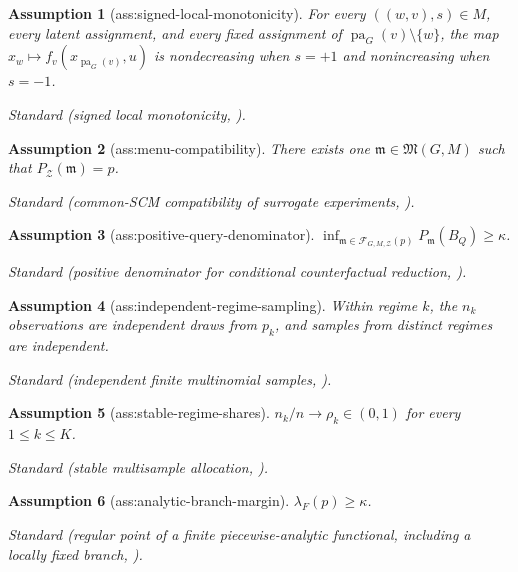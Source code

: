 \documentclass{article}
\newtheorem{assumption}{Assumption}
\begin{document}
\begin{assumption}[ass:signed-local-monotonicity]\label{ass:signed-local-monotonicity}
For every \(((w,v),s)\in M\), every latent assignment, and every fixed assignment of \(\operatorname{pa}_G(v)\setminus\{w\}\), the map \(x_w\mapsto f_v(x_{\operatorname{pa}_G(v)},u)\) is nondecreasing when \(s=+1\) and nonincreasing when \(s=-1\).
\par\smallskip\noindent\emph{Standard} (signed local monotonicity, \cite{MaitiPleckoBareinboim2025}).
\end{assumption}

\begin{assumption}[ass:menu-compatibility]\label{ass:menu-compatibility}
There exists one \(\mathfrak m\in\mathfrak M(G,M)\) such that \(P_{\mathcal Z}(\mathfrak m)=p\).
\par\smallskip\noindent\emph{Standard} (common-SCM compatibility of surrogate experiments, \cite{CorreaLeeBareinboim2021}).
\end{assumption}

\begin{assumption}[ass:positive-query-denominator]\label{ass:positive-query-denominator}
\(\inf_{\mathfrak m\in\mathcal F_{G,M,\mathcal Z}(p)}P_{\mathfrak m}(B_Q)\ge\kappa\).
\par\smallskip\noindent\emph{Standard} (positive denominator for conditional counterfactual reduction, \cite{CorreaLeeBareinboim2021}).
\end{assumption}

\begin{assumption}[ass:independent-regime-sampling]\label{ass:independent-regime-sampling}
Within regime \(k\), the \(n_k\) observations are independent draws from \(p_k\), and samples from distinct regimes are independent.
\par\smallskip\noindent\emph{Standard} (independent finite multinomial samples, \cite{VanDerVaart1998}).
\end{assumption}

\begin{assumption}[ass:stable-regime-shares]\label{ass:stable-regime-shares}
\(n_k/n\to\rho_k\in(0,1)\) for every \(1\le k\le K\).
\par\smallskip\noindent\emph{Standard} (stable multisample allocation, \cite{VanDerVaart1998}).
\end{assumption}

\begin{assumption}[ass:analytic-branch-margin]\label{ass:analytic-branch-margin}
\(\lambda_F(p)\ge\kappa\).
\par\smallskip\noindent\emph{Standard} (regular point of a finite piecewise-analytic functional, including a locally fixed branch, \cite{VanDerVaart1998}).
\end{assumption}
\end{document}
